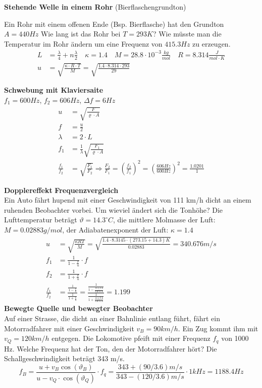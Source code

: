 \textbf{Stehende Welle in einem Rohr} (Bierflaschengrundton)

Ein Rohr mit einem offenen Ende (Bsp. Bierflasche) hat den Grundton $A = 440Hz$ Wie lang ist das Rohr bei $T = 293K$? Wie müsste man die Temperatur im Rohr ändern um eine Frequenz von $415.3Hz$ zu erzeugen.\\
\begin{align*}
L&=\frac{\lambda}{4} + n\frac{\lambda}{2}\quad \kappa= 1.4  \quad M=28.8\cdot 10^{-3}\frac{kg}{mol} \quad R=8.314\frac{J}{mol\cdot K}\\
u&=\sqrt{\frac{\kappa\cdot R\cdot T}{M}}=\sqrt{\frac{1.4\cdot 8.314\cdot 293}{29}}
\end{align*}

\textbf{Schwebung mit Klaviersaite}\\
$f_1 = 600Hz$, $f_2 = 606Hz$, $\Delta f = 6Hz$
\begin{align*}
u&=\sqrt{\frac{F}{\varrho\cdot A}}\\
f&=\frac{u}{2}\\
\lambda &= 2\cdot L\\
f_1&=\frac{1}{\lambda}\sqrt{\frac{F_1}{\varrho\cdot A}}\\
\frac{f_1}{f_2} &= \sqrt{\frac{F_1}{F_2}}\Rightarrow \frac{F_2}{F_1} = \left(\frac{f_2}{f_1}\right)^2 = \left(\frac{606Hz}{600Hz}\right)^2 = \frac{1.0201}{1}
\end{align*}



\textbf{Dopplereffekt}
\textbf{Frequenzvergleich}\\
Ein Auto fährt hupend mit einer Geschwindigkeit von 111 km/h dicht an einem ruhenden Beobachter vorbei. Um wieviel ändert sich die Tonhöhe? Die Lufttemperatur beträgt $\vartheta = 14.3^\circ C$, die mittlere Molmasse der Luft: $M=0.02883 g/mol$, der Adiabatenexponent der Luft: $\kappa = 1.4$\\
\begin{align*}
u&= \sqrt{\frac{\kappa R T}{M}} = \sqrt{\frac{1.4\cdot 8.3145\cdot (273.15+14.3)K}{0.02883}} = 340.676m/s\\
f_1 &= \frac{1}{1-\frac{v}{u}}\cdot f\\
f_2 &= \frac{1}{1+\frac{v}{u}}\cdot f\\
\frac{f_1}{f_2} &= \frac{\frac{1}{1-\frac{v}{u}}}{\frac{1}{1+\frac{v}{u}}} = \frac{\frac{1}{1-\frac{111/3.6}{340.676}}}{\frac{1}{1+\frac{111/3.6}{340.676}}} = 1.199
\end{align*}
\textbf{Bewegte Quelle und bewegter Beobachter}\\
Auf einer Strasse, die dicht an einer Bahnlinie entlang führt, fährt ein Motorradfahrer mit einer Geschwindigkeit $v_B =  90 km/h$. Ein Zug kommt ihm mit $v_Q =  120 km/h$ entgegen. Die Lokomotive pfeift mit einer Frequenz $f_q$ von 1000 Hz. Welche Frequenz hat der Ton, den
der Motorradfahrer hört? Die Schallgeschwindigkeit beträgt 343 m/s.
\[
f_B = \frac{u+v_B \cos(\vartheta_B)}{u-v_Q \cdot \cos(\vartheta_Q)}\cdot f_q = \frac{343+(90/3.6)m/s}{343-(120/3.6)m/s} \cdot 1kHz = 1188.4Hz
\]



